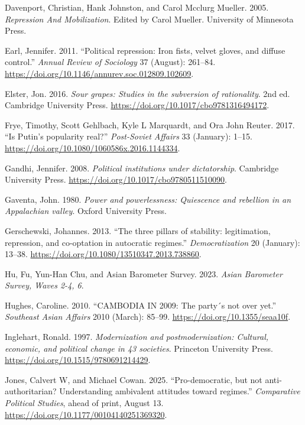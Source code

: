\documentclass[Review,times,sageh,doublespace]{sagej}
\newlength{\cslhangindent}
\newenvironment{CSLReferences}[2] %
 {\begin{list}{}{%
  \setlength{\itemindent}{0pt}
  \setlength{\leftmargin}{0pt}
  \setlength{\parsep}{0pt}
  \ifodd #1
   \setlength{\leftmargin}{\cslhangindent}
   \setlength{\itemindent}{-1\cslhangindent}
  \fi
  \setlength{\itemsep}{#2\baselineskip}}}
 {\end{list}}
\begin{document}
\begin{CSLReferences}{1}{1}
Davenport, Christian, Hank Johnston, and Carol Mcclurg Mueller. 2005.
\emph{{Repression And Mobilization}}. Edited by Carol Mueller.
University of Minnesota Press.

Earl, Jennifer. 2011. {``{Political repression: Iron fists, velvet
gloves, and diffuse control}.''} \emph{Annual Review of Sociology} 37
(August): 261--84.
\url{https://doi.org/10.1146/annurev.soc.012809.102609}.

Elster, Jon. 2016. \emph{{Sour grapes: Studies in the subversion of
rationality}}. 2nd ed. Cambridge University Press.
\url{https://doi.org/10.1017/cbo9781316494172}.

Frye, Timothy, Scott Gehlbach, Kyle L Marquardt, and Ora John Reuter.
2017. {``{Is Putin's popularity real?}''} \emph{Post-Soviet Affairs} 33
(January): 1--15. \url{https://doi.org/10.1080/1060586x.2016.1144334}.

Gandhi, Jennifer. 2008. \emph{{Political institutions under
dictatorship}}. Cambridge University Press.
\url{https://doi.org/10.1017/cbo9780511510090}.

Gaventa, John. 1980. \emph{{Power and powerlessness: Quiescence and
rebellion in an Appalachian valley}}. Oxford University Press.

Gerschewski, Johannes. 2013. {``{The three pillars of stability:
legitimation, repression, and co-optation in autocratic regimes}.''}
\emph{Democratization} 20 (January): 13--38.
\url{https://doi.org/10.1080/13510347.2013.738860}.

Hu, Fu, Yun-Han Chu, and Asian Barometer Survey. 2023. \emph{{Asian
Barometer Survey, Waves 2-4, 6}}.

Hughes, Caroline. 2010. {``{CAMBODIA IN 2009: The party´s not over
yet}.''} \emph{Southeast Asian Affairs} 2010 (March): 85--99.
\url{https://doi.org/10.1355/seaa10f}.

Inglehart, Ronald. 1997. \emph{{Modernization and postmodernization:
Cultural, economic, and political change in 43 societies}}. Princeton
University Press. \url{https://doi.org/10.1515/9780691214429}.

Jones, Calvert W, and Michael Cowan. 2025. {``{Pro-democratic, but not
anti-authoritarian? Understanding ambivalent attitudes toward
regimes}.''} \emph{Comparative Political Studies}, ahead of print,
August 13. \url{https://doi.org/10.1177/00104140251369320}.


\end{CSLReferences}
\end{document}
